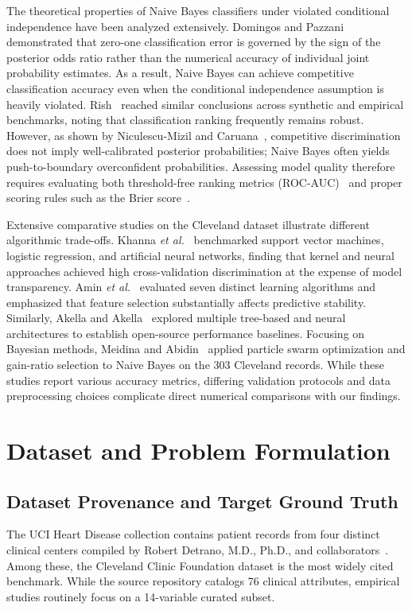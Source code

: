 \documentclass[conference]{IEEEtran}
\begin{document}
The theoretical properties of Naive Bayes classifiers under violated conditional independence have been analyzed extensively. Domingos and Pazzani~\cite{domingos1997} demonstrated that zero-one classification error is governed by the sign of the posterior odds ratio rather than the numerical accuracy of individual joint probability estimates. As a result, Naive Bayes can achieve competitive classification accuracy even when the conditional independence assumption is heavily violated. Rish~\cite{rish2001} reached similar conclusions across synthetic and empirical benchmarks, noting that classification ranking frequently remains robust. However, as shown by Niculescu-Mizil and Caruana~\cite{niculescu2005}, competitive discrimination does not imply well-calibrated posterior probabilities; Naive Bayes often yields push-to-boundary overconfident probabilities. Assessing model quality therefore requires evaluating both threshold-free ranking metrics (ROC-AUC)~\cite{fawcett2006} and proper scoring rules such as the Brier score~\cite{brier1950}.

Extensive comparative studies on the Cleveland dataset illustrate different algorithmic trade-offs. Khanna \textit{et al.}~\cite{khanna2015} benchmarked support vector machines, logistic regression, and artificial neural networks, finding that kernel and neural approaches achieved high cross-validation discrimination at the expense of model transparency. Amin \textit{et al.}~\cite{amin2019} evaluated seven distinct learning algorithms and emphasized that feature selection substantially affects predictive stability. Similarly, Akella and Akella~\cite{akella2021} explored multiple tree-based and neural architectures to establish open-source performance baselines. Focusing on Bayesian methods, Meidina and Abidin~\cite{meidina2023} applied particle swarm optimization and gain-ratio selection to Naive Bayes on the 303 Cleveland records. While these studies report various accuracy metrics, differing validation protocols and data preprocessing choices complicate direct numerical comparisons with our findings.

\section{Dataset and Problem Formulation}

\subsection{Dataset Provenance and Target Ground Truth}
The UCI Heart Disease collection contains patient records from four distinct clinical centers compiled by Robert Detrano, M.D., Ph.D., and collaborators~\cite{uci,aha1988}. Among these, the Cleveland Clinic Foundation dataset is the most widely cited benchmark. While the source repository catalogs 76 clinical attributes, empirical studies routinely focus on a 14-variable curated subset.
\end{document}
